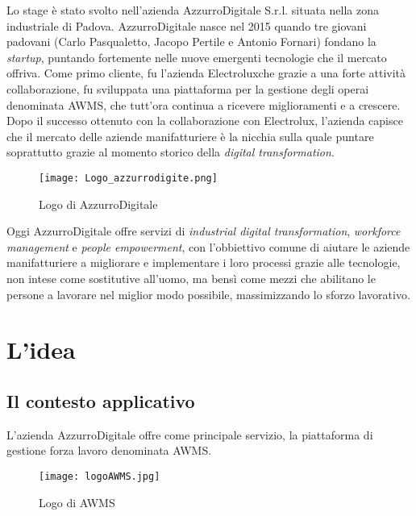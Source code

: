 Lo stage è stato svolto nell'azienda AzzurroDigitale S.r.l. situata nella zona industriale di Padova. AzzurroDigitale nasce nel 2015 quando tre giovani padovani (Carlo Pasqualetto, Jacopo Pertile e Antonio Fornari) fondano la \emph{startup}, puntando fortemente nelle nuove emergenti tecnologie che il mercato offriva. Come primo cliente, fu l'azienda 	\gls{Electrolux}\glsfirstoccur che grazie a una forte attività collaborazione, fu sviluppata una piattaforma per la gestione degli operai denominata \gls{AWMS}\glsfirstoccur, che tutt’ora continua a ricevere miglioramenti e a crescere. Dopo il successo ottenuto con la collaborazione con \gls{Electrolux}, l'azienda capisce che il mercato delle aziende manifatturiere è la nicchia sulla quale puntare soprattutto grazie al momento storico della \emph{digital transformation}. \\
\clearpage
\begin{figure}[h]
	\begin{center}
		\texttt{[image: Logo\_azzurrodigite.png]}
			\caption{Logo di AzzurroDigitale}
	\end{center}
\end{figure}

Oggi AzzurroDigitale offre servizi di \emph{industrial digital transformation}, \emph{workforce management} e \emph{people empowerment}, con l'obbiettivo comune di aiutare le aziende manifatturiere a migliorare e implementare i loro processi grazie alle tecnologie, non intese come sostitutive all’uomo, ma bensì come mezzi che abilitano le persone a lavorare nel miglior modo possibile, massimizzando lo sforzo lavorativo.\\

\section{L'idea}

\subsection{Il contesto applicativo}
L'azienda AzzurroDigitale offre come principale servizio, la piattaforma di gestione forza lavoro denominata \gls{AWMS}.\\
	\begin{figure}[!h] 
		\begin{center}
			\texttt{[image: logoAWMS.jpg]}
			\caption{Logo di AWMS}
		\end{center}
	\end{figure}

